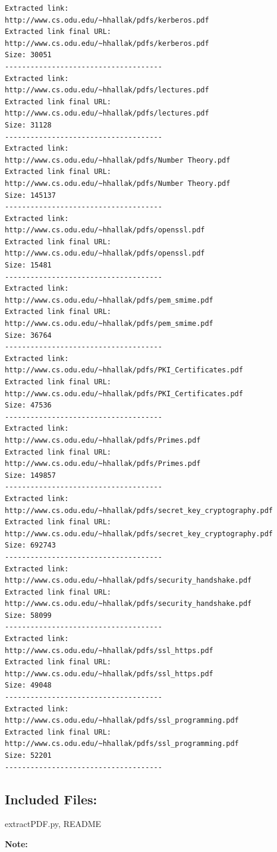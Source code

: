 \documentclass[a4paper, 11pt]{article}
\begin{document}
\begin{lstlisting}[language=bash]
Extracted link:
http://www.cs.odu.edu/~hhallak/pdfs/kerberos.pdf
Extracted link final URL:
http://www.cs.odu.edu/~hhallak/pdfs/kerberos.pdf
Size: 30051
-------------------------------------
Extracted link:
http://www.cs.odu.edu/~hhallak/pdfs/lectures.pdf
Extracted link final URL:
http://www.cs.odu.edu/~hhallak/pdfs/lectures.pdf
Size: 31128
-------------------------------------
Extracted link:
http://www.cs.odu.edu/~hhallak/pdfs/Number Theory.pdf
Extracted link final URL:
http://www.cs.odu.edu/~hhallak/pdfs/Number Theory.pdf
Size: 145137
-------------------------------------
Extracted link:
http://www.cs.odu.edu/~hhallak/pdfs/openssl.pdf
Extracted link final URL:
http://www.cs.odu.edu/~hhallak/pdfs/openssl.pdf
Size: 15481
-------------------------------------
Extracted link:
http://www.cs.odu.edu/~hhallak/pdfs/pem_smime.pdf
Extracted link final URL:
http://www.cs.odu.edu/~hhallak/pdfs/pem_smime.pdf
Size: 36764
-------------------------------------
Extracted link:
http://www.cs.odu.edu/~hhallak/pdfs/PKI_Certificates.pdf
Extracted link final URL:
http://www.cs.odu.edu/~hhallak/pdfs/PKI_Certificates.pdf
Size: 47536
-------------------------------------
Extracted link:
http://www.cs.odu.edu/~hhallak/pdfs/Primes.pdf
Extracted link final URL:
http://www.cs.odu.edu/~hhallak/pdfs/Primes.pdf
Size: 149857
-------------------------------------
Extracted link:
http://www.cs.odu.edu/~hhallak/pdfs/secret_key_cryptography.pdf
Extracted link final URL:
http://www.cs.odu.edu/~hhallak/pdfs/secret_key_cryptography.pdf
Size: 692743
-------------------------------------
Extracted link:
http://www.cs.odu.edu/~hhallak/pdfs/security_handshake.pdf
Extracted link final URL:
http://www.cs.odu.edu/~hhallak/pdfs/security_handshake.pdf
Size: 58099
-------------------------------------
Extracted link:
http://www.cs.odu.edu/~hhallak/pdfs/ssl_https.pdf
Extracted link final URL:
http://www.cs.odu.edu/~hhallak/pdfs/ssl_https.pdf
Size: 49048
-------------------------------------
Extracted link:
http://www.cs.odu.edu/~hhallak/pdfs/ssl_programming.pdf
Extracted link final URL:
http://www.cs.odu.edu/~hhallak/pdfs/ssl_programming.pdf
Size: 52201
-------------------------------------

\end{lstlisting}
\subsection*{Included Files:}
extractPDF.py, README
\newline

\noindent
\textbf{Note:}
\end{document}
